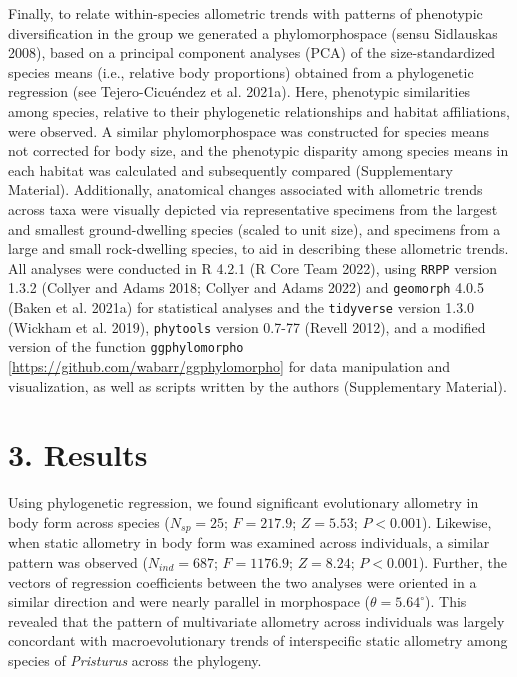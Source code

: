 \documentclass[
  11pt,
]{article}
\begin{document}
Finally, to relate within-species allometric trends with patterns of
phenotypic diversification in the group we generated a phylomorphospace
(sensu Sidlauskas 2008), based on a principal component analyses (PCA)
of the size-standardized species means (i.e., relative body proportions)
obtained from a phylogenetic regression (see Tejero-Cicuéndez et al.
2021a). Here, phenotypic similarities among species, relative to their
phylogenetic relationships and habitat affiliations, were observed. A
similar phylomorphospace was constructed for species means not corrected
for body size, and the phenotypic disparity among species means in each
habitat was calculated and subsequently compared (Supplementary
Material). Additionally, anatomical changes associated with allometric
trends across taxa were visually depicted via representative specimens
from the largest and smallest ground-dwelling species (scaled to unit
size), and specimens from a large and small rock-dwelling species, to
aid in describing these allometric trends. All analyses were conducted
in R 4.2.1 (R Core Team 2022), using \texttt{RRPP} version 1.3.2
(Collyer and Adams 2018; Collyer and Adams 2022) and \texttt{geomorph}
4.0.5 (Baken et al. 2021a) for statistical analyses and the
\texttt{tidyverse} version 1.3.0 (Wickham et al. 2019),
\texttt{phytools} version 0.7-77 (Revell 2012), and a modified version
of the function \texttt{ggphylomorpho}
{[}\url{https://github.com/wabarr/ggphylomorpho}{]} for data
manipulation and visualization, as well as scripts written by the
authors (Supplementary Material).

\hypertarget{results}{%
\section{3. Results}\label{results}}

Using phylogenetic regression, we found significant evolutionary
allometry in body form across species (\(N_{sp}=25\); \(F = 217.9\);
\(Z =5.53\); \(P < 0.001\)). Likewise, when static allometry in body
form was examined across individuals, a similar pattern was observed
(\(N_{ind}=687\); \(F = 1176.9\); \(Z =8.24\); \(P < 0.001\)). Further,
the vectors of regression coefficients between the two analyses were
oriented in a similar direction and were nearly parallel in morphospace
(\(\theta = 5.64^\circ\)). This revealed that the pattern of
multivariate allometry across individuals was largely concordant with
macroevolutionary trends of interspecific static allometry among species
of \emph{Pristurus} across the phylogeny. \hfill\break
\end{document}
